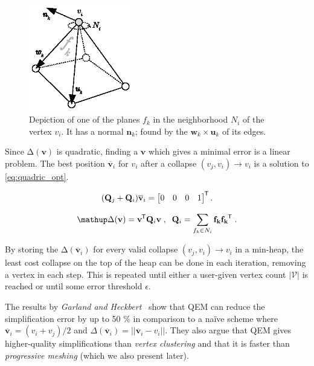 \begin{figure}[ht]
  \centering
  \includegraphics[width=0.4\textwidth]{figures/quadric_planes.eps}
  \caption{Depiction of one of the planes \(f_k\) in the neighborhood \(N_i\) of the vertex \(v_i\). It has a normal \(\mathbf{n}_k\); found by the \(\mathbf{w}_k \times \mathbf{u}_k\) of its edges.}
  \label{fig:quadrics}
\end{figure}


Since \(\mathup\Delta(\mathbf{v})\) is quadratic, finding a \(\mathbf{v}\) which gives a minimal error is a linear problem. The best position \(\mathbf{\overline{v}}_i\) for \(v_i\) after a collapse \((v_j, v_i) \rightarrow v_i\) is a solution to \cref{eq:quadric_opt}.

\begin{equation} \label{eq:quadric_opt}
(\mathbf{Q}_j + \mathbf{Q}_i)\mathbf{\overline{v}}_i = \begin{bmatrix} 0 & 0 & 0 & 1 \end{bmatrix}^{\mkern-1.5mu\mathsf{T}}.
\end{equation}

\begin{equation} \label{eq:homogeneous_quadric}
      \mathup\Delta(\mathbf{v}) = \mathbf{v}\transpose \mathbf{Q}_i  \mathbf{v} \;,\;\; \mathbf{Q}_i = \sum_{f_k \in N_i}  \mathbf{f_k} \mathbf{f_k}\transpose \; .
\end{equation}

By storing the \(\mathup\Delta(\mathbf{\overline{v}}_i)\) for every valid collapse \((v_j, v_i) \rightarrow v_i\) in a min-heap, the least cost collapse on the top of the heap can be done in each iteration, removing a vertex in each step. This is repeated until either a user-given vertex count \(|\mathcal{V}|\) is reached or until some error threshold \(\epsilon\).

The results by \emph{Garland and Heckbert}~\cite{garland1997surface} show that QEM can reduce the simplification error by up to 50 \% in comparison to a na\"ive scheme where \(\mathbf{\overline{v}}_i = (v_i + v_j) / 2\) and \(\Delta(\mathbf{\overline{v}}_i) = ||\mathbf{\overline{v}}_i - v_i||\). They also argue that QEM gives higher-quality simplifications than \emph{vertex clustering} and that it is faster than \emph{progressive meshing} (which we also present later).

